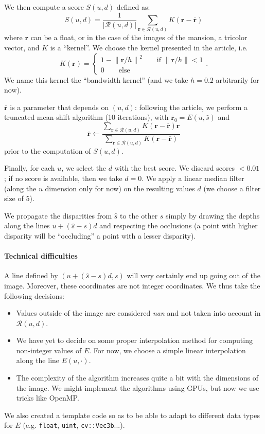\documentclass{article}
\newcommand{\abs} [1] {\left| #1 \right|}
\newcommand{\norm}[1]{\left\lVert#1\right\rVert}
\theoremstyle{definition}
\begin{document}
We then compute a score $S(u, d)$ defined as:
\[ S(u, d) = \frac{1}{\abs{\mathcal{R}(u, d)}} \sum_{\mathbf{r} \in \mathcal{R}(u, d)} K(\mathbf{r} - \overline{\mathbf{r}})\]
where $\mathbf{r}$ can be a float, or in the case of the images of the mansion, a tricolor vector, and $K$ is a ``kernel''. We choose the kernel presented in the article, i.e.
\[ K(\mathbf{r}) = \left\{ 
\begin{array}{l}
1 - \norm{\mathbf{r} / h}^2 \qquad \text{if $\norm{\mathbf{r} / h} < 1$} \\
0 \qquad \text{else}                            
\end{array} \right. .
\]
We name this kernel the ``bandwidth kernel'' (and we take $h = 0.2$ arbitrarily for now).

$\overline{\mathbf{r}}$ is a parameter that depends on $(u, d)$: following the article, we perform a truncated mean-shift algorithm (10 iterations), with $\overline{\mathbf{r}}_0 = E(u, \widehat{s})$ and
\[ \overline{\mathbf{r}} \leftarrow \frac{\sum_{\mathbf{r} \in \mathcal{R}(u, d)} K(\mathbf{r} - \overline{\mathbf{r}}) \mathbf{r}}{\sum_{\mathbf{r} \in \mathcal{R}(u, d)} K(\mathbf{r} - \overline{\mathbf{r}})}\]
prior to the computation of $S(u, d)$.

Finally, for each $u$, we select the $d$ with the best score. We discard scores $< 0.01$ ; if no score is available, then we take $d=0$. We apply a linear median filter (along the $u$ dimension only for now) on the resulting values $d$ (we choose a filter size of $5$).

We propagate the disparities from $\widehat{s}$ to the other $s$ simply by drawing the depths along the lines $u + (\widehat{s} - s)d$ and respecting the occlusions (a point with higher disparity will be ``occluding'' a point with a lesser disparity).


\paragraph{Technical difficulties} A line defined by $(u + (\widehat{s} - s) d, s)$ will very certainly end up going out of the image. Moreover, these coordinates are not integer coordinates. We thus take the following decisions:
\begin{itemize}
 \item Values outside of the image are considered \emph{nan} and not taken into account in $\mathcal{R}(u, d)$.
 \item We have yet to decide on some proper interpolation method for computing non-integer values of $E$. For now, we choose a simple linear interpolation along the line $E(u, \cdot)$.
 \item The complexity of the algorithm increases quite a bit with the dimensions of the image. We might implement the algorithms using GPUs, but now we use tricks like OpenMP.
\end{itemize}
We also created a template code so as to be able to adapt to different data types for $E$ (e.g. \verb#float#, \verb#uint#, \verb#cv::Vec3b#...).
\end{document}
